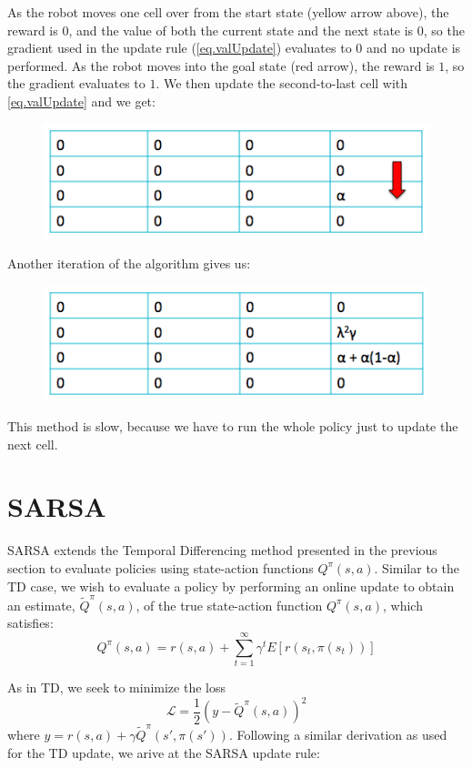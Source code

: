 \documentclass[11pt]{article}
\numberwithin{equation}{section}
\numberwithin{figure}{section}
\begin{document}
As the robot moves one cell over from the start state (yellow arrow above), the reward is $0$, and the value of both the current state and the next state is $0$, so the gradient used in the update rule (\cref{eq.valUpdate}) evaluates to $0$ and no update is performed. As the robot moves into the goal state (red arrow), the reward is $1$, so the gradient evaluates to $1$.  We then update the second-to-last cell with \cref{eq.valUpdate} and we get:

\begin{figure}[h!]
	\centering
	\includegraphics[width=.4\columnwidth]{./images/fig3}
	\label{fig.fig3}
\end{figure}

Another iteration of the algorithm gives us:

\begin{figure}[h!]
	\centering
	\includegraphics[width=.4\columnwidth]{./images/fig4}
	\label{fig.fig4}
\end{figure}

This method is slow, because we have to run the whole policy just to update the next cell.  

\section{SARSA}
SARSA extends the Temporal Differencing method presented in the previous section to evaluate policies using state-action functions $Q^\pi(s,a)$. Similar to the TD case, we wish to evaluate a policy by performing an online update to obtain an estimate, $\tilde{Q}^\pi(s,a)$, of the true state-action function $Q^\pi(s,a)$, which satisfies:
\begin{equation}
	Q^\pi(s,a) = r(s,a) + \sum_{t = 1}^\infty \gamma^t E[r(s_t,\pi(s_t))]
	\label{eq.sarsaEval}
\end{equation}

As in TD, we seek to minimize the loss
\begin{equation}
	\mathcal{L} = \frac{1}{2} \left(y - \tilde{Q}^\pi(s,a) \right)^2
	\label{eq.sarsaLoss}
\end{equation}
where $y = r(s,a) + \gamma \tilde{Q}^\pi(s',\pi(s'))$. Following a similar derivation as used for the TD update, we arive at the SARSA update rule:
\end{document}
